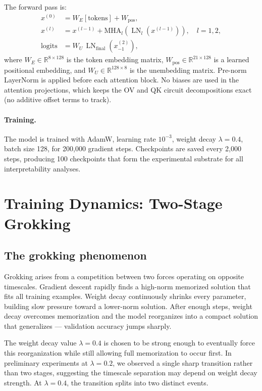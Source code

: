 \documentclass[11pt, a4paper]{article}
\DeclareMathOperator{\LN}{LN}
\begin{document}
The forward pass is:
\begin{align}
  x^{(0)} &= W_E[\mathrm{tokens}] + W_{\mathrm{pos}}, \\
  x^{(l)} &= x^{(l-1)} + \mathrm{MHA}_l\!\left(\LN_l(x^{(l-1)})\right),
  \quad l = 1, 2, \\
  \mathrm{logits} &= W_U\, \LN_{\mathrm{final}}\!\left(x^{(2)}_{-1}\right),
\end{align}
where $W_E \in \mathbb{R}^{8 \times 128}$ is the token embedding
matrix, $W_{\mathrm{pos}} \in \mathbb{R}^{21 \times 128}$ is a
learned positional embedding, and $W_U \in \mathbb{R}^{128 \times 8}$
is the unembedding matrix.  Pre-norm LayerNorm is applied before each
attention block.  No biases are used in the attention projections, which
keeps the OV and QK circuit decompositions exact (no additive offset
terms to track).

\paragraph{Training.}
The model is trained with AdamW, learning rate $10^{-3}$, weight decay
$\lambda = 0.4$, batch size 128, for 200{,}000 gradient steps.
Checkpoints are saved every 2{,}000 steps, producing 100 checkpoints
that form the experimental substrate for all interpretability analyses.

\section{Training Dynamics: Two-Stage Grokking}
\label{sec:training}

\subsection{The grokking phenomenon}

Grokking arises from a competition between two forces operating on
opposite timescales.  Gradient descent rapidly finds a high-norm
memorized solution that fits all training examples.  Weight decay
continuously shrinks every parameter, building slow pressure toward a
lower-norm solution.  After enough steps, weight decay overcomes
memorization and the model reorganizes into a compact solution that
generalizes --- validation accuracy jumps sharply.

The weight decay value $\lambda = 0.4$ is chosen to be strong enough
to eventually force this reorganization while still allowing full
memorization to occur first.  In preliminary experiments at
$\lambda = 0.2$, we observed a single sharp transition rather than two
stages, suggesting the timescale separation may depend on weight decay
strength.  At $\lambda = 0.4$, the transition splits into two distinct
events.
\end{document}
